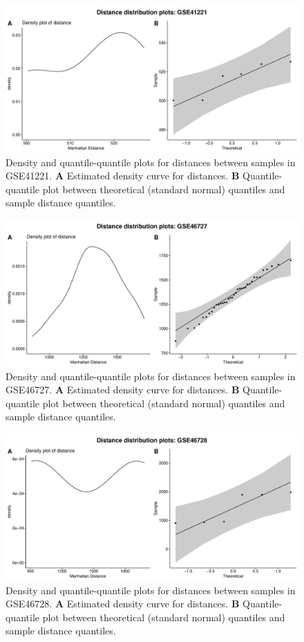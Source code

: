 \documentclass[10pt,letterpaper]{article}\usepackage[]{graphicx}\usepackage[]{color}
\begin{document}
\begin{figure}[H]
	\includegraphics[width=\textwidth]{manhattan-distance_hist_GSE41221.pdf}
	\caption{Density and quantile-quantile plots for distances between samples in GSE41221. \textbf{A} Estimated density curve for distances. \textbf{B} Quantile-quantile plot between theoretical (standard normal) quantiles and sample distance quantiles.}
\end{figure}

\begin{figure}[H]
	\includegraphics[width=\textwidth]{manhattan-distance_hist_GSE46727.pdf}
	\caption{Density and quantile-quantile plots for distances between samples in GSE46727. \textbf{A} Estimated density curve for distances. \textbf{B} Quantile-quantile plot between theoretical (standard normal) quantiles and sample distance quantiles.}
\end{figure}

\begin{figure}[H]
	\includegraphics[width=\textwidth]{manhattan-distance_hist_GSE46728.pdf}
	\caption{Density and quantile-quantile plots for distances between samples in GSE46728. \textbf{A} Estimated density curve for distances. \textbf{B} Quantile-quantile plot between theoretical (standard normal) quantiles and sample distance quantiles.}
\end{figure}
\end{document}

